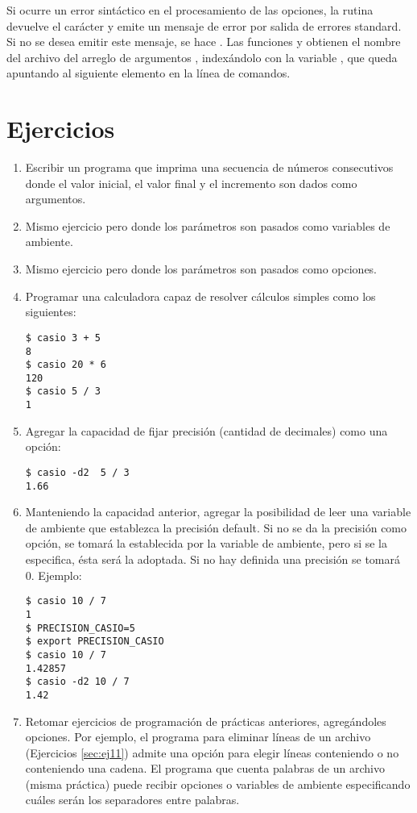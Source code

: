 Si ocurre un error sintáctico en el procesamiento de las opciones, la rutina
devuelve el carácter  y emite un mensaje de error por salida de errores
standard. Si no se desea emitir este mensaje, se hace .
Las funciones  y  obtienen el nombre del archivo del
arreglo de argumentos , indexándolo con la variable , que queda
apuntando al siguiente elemento en la línea de comandos.

\section{Ejercicios}
\begin{enumerate}
\item Escribir un programa que imprima una secuencia de números consecutivos donde
el valor inicial, el valor final y el incremento son dados como argumentos.
\item Mismo ejercicio pero donde los parámetros son pasados como variables de
ambiente.
\item Mismo ejercicio pero donde los parámetros son pasados como opciones.
\item Programar una calculadora capaz de resolver cálculos simples como los
siguientes:
\begin{lstlisting}
$ casio 3 + 5
8
$ casio 20 * 6
120
$ casio 5 / 3
1
\end{lstlisting}
\item Agregar la capacidad de fijar precisión (cantidad de decimales) como una
opción:
\begin{lstlisting}
$ casio -d2  5 / 3
1.66
\end{lstlisting}
\item Manteniendo la capacidad anterior, agregar la posibilidad de leer una
variable de ambiente que establezca la precisión default. Si no se da la
precisión como opción, se tomará la establecida por la variable de ambiente,
pero si se la especifica, ésta será la adoptada. Si no hay definida una
precisión se tomará 0. Ejemplo:
\begin{lstlisting}
$ casio 10 / 7
1
$ PRECISION_CASIO=5
$ export PRECISION_CASIO
$ casio 10 / 7
1.42857
$ casio -d2 10 / 7
1.42
\end{lstlisting}
\item Retomar ejercicios de programación de prácticas anteriores, agregándoles opciones. Por ejemplo, el programa para eliminar líneas de un archivo (Ejercicios \ref{sec:ej11}) admite una opción para elegir líneas conteniendo o no conteniendo una cadena. El programa que cuenta palabras de un archivo (misma práctica) puede recibir opciones o variables de ambiente especificando cuáles serán los separadores entre palabras.
\end{enumerate}
